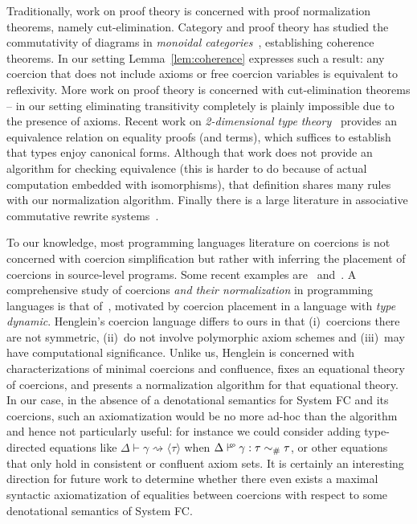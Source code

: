 \documentclass[a4paper,UKenglish]{lipics}
\def\fiddle#1{\hspace*{-0.8ex}\raisebox{0.1ex}{$\scriptscriptstyle#1$}}
\newcommand{\wfco}{\vdash^{\fiddle{\sf{co}}}}
\newcommand{\psim}{\mathrel{\sim_{\tiny \#}}}
\newcommand{\refl}[1]{\langle#1\rangle}  %
\newcommand{\rsa}[1]{\rightsquigarrow_{#1}}
\begin{document}
Traditionally, work on proof theory is concerned with proof normalization theorems, namely cut-elimination.
Category and proof theory has studied the commutativity of diagrams in {\em monoidal
categories}~\cite{MacLaneS:catwm}, establishing coherence theorems. In our setting Lemma~\ref{lem:coherence}
expresses such a result: any coercion that does not include axioms or free coercion variables is equivalent
to reflexivity. More work on proof theory is concerned with cut-elimination theorems -- in our setting 
eliminating transitivity completely is plainly impossible due to the presence of axioms. 
Recent work on {\em 2-dimensional type theory}~\cite{Licata:2012:CTT:2103656.2103697} provides an equivalence 
relation on equality proofs (and terms), 
which suffices to establish that types enjoy canonical forms. Although that work does not provide an algorithm
for checking equivalence (this is harder to do because of actual computation embedded with isomorphisms), that
definition shares many rules with our normalization algorithm. Finally there is a large literature in associative
commutative rewrite systems~\cite{Dershowitz:1983:AR:1623516.1623594,Bachmair:1985:TOA:6947.6948}.

To our knowledge, most programming languages literature on coercions is not concerned with coercion 
simplification but rather with inferring the placement of coercions in 
source-level programs. Some recent examples are~\cite{luo:coercions} and~\cite{Swamy:2009:TTC:1596550.1596598}. 
A comprehensive study of coercions {\em and their normalization} in programming languages
is that of~\cite{henglein:coercions}, motivated by coercion placement in a language with
{\em type dynamic}. Henglein's coercion language differs to ours in that (i)~coercions there 
are not symmetric, (ii)~do not involve polymorphic axiom schemes and (iii)~may have computational significance.
Unlike us, Henglein is concerned with characterizations of minimal coercions and confluence, 
fixes an equational theory of coercions, and presents a normalization algorithm for that equational theory. 
In our case, in the absence of a denotational semantics for System FC and its coercions, 
such an axiomatization would be no more ad-hoc than the algorithm and 
hence not particularly useful: for instance we could consider adding type-directed
equations like $\Delta \vdash \gamma \rsa{} \refl{\tau}$ when $\Delta \wfco \gamma : \tau \psim \tau$, or other equations 
that only hold in consistent or confluent axiom sets. It is certainly an 
interesting direction for future work to determine whether 
there even exists a maximal syntactic axiomatization of 
equalities between coercions with respect to some denotational semantics 
of System FC.
\end{document}
